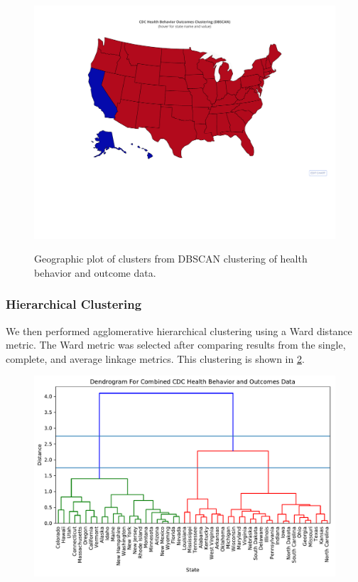 \documentclass{article}
\begin{document}
\begin{figure}[h]
\centering
\caption{Geographic plot of clusters from DBSCAN clustering of health behavior and outcome data.}
\includegraphics[width=\linewidth]{images/cdc_health_behavior_and_outcomes_dbscan_map.pdf}
\label{fig:dbhealthmap}
\end{figure}

\subsubsection{Hierarchical Clustering}
We then performed agglomerative hierarchical clustering using a Ward distance metric. The Ward metric was selected after comparing results from the single, complete, and average linkage metrics. This clustering is shown in \ref{fig:dbhealthdg}.

\begin{figure}[h]
\centering
\caption{}
\includegraphics[width=\linewidth]{images/cdc_health_behavior_and_outcomes_agglomerative_dendrogram.pdf}
\label{fig:dbhealthdg}
\end{figure}
\end{document}
